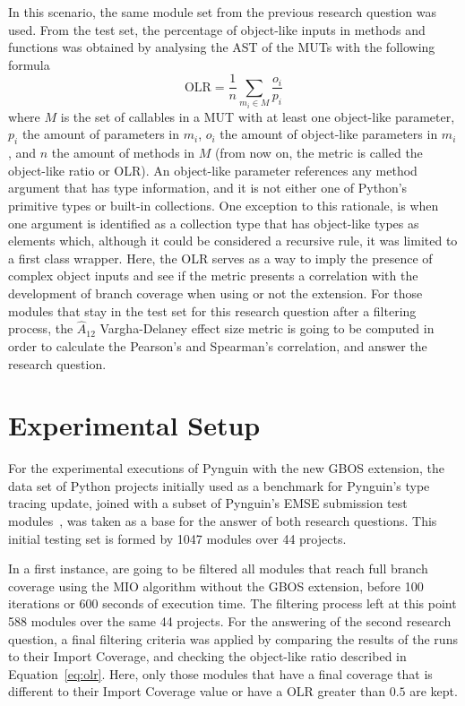 \documentclass[%
  chapterprefix=false,%
  open=right,%
  twoside=true,%
  paper=a4,%
  logofile={Figures/logo.png},%
  thesistype=master,%
  UKenglish,%
]{se2thesis}
\begin{document}
In this scenario, the same module set from the previous research question was used.
From the test set, the percentage of object-like inputs in methods and functions was obtained by analysing the AST of the MUTs with the following formula
\begin{equation}\label{eq:olr}
\text{OLR} = \frac{1}{n}\sum_{m_i \in M} \frac{o_i}{p_i}
\end{equation}
where \(M\) is the set of callables in a MUT with at least one object-like parameter, \(p_i\) the amount of parameters in \(m_i\), \(o_i\) the amount of object-like parameters in \(m_i\), and \(n\) the amount of methods in \(M\) (from now on, the metric is called the object-like ratio or OLR).
An object-like parameter references any method argument that has type information, and it is not either one of Python's primitive types or built-in collections.
One exception to this rationale, is when one argument is identified as a collection type that has object-like types as elements which, although it could be considered a recursive rule, it was limited to a first class wrapper.
Here, the OLR serves as a way to imply the presence of complex object inputs and see if the metric presents a correlation with the development of branch coverage when using or not the extension.
For those modules that stay in the test set for this research question after a filtering process, the \(\hat{A}_{12}\) Vargha-Delaney effect size metric is going to be computed in order to calculate the Pearson's and Spearman's correlation, and answer the research question. 

\section{Experimental Setup}\label{sec:experimental_setup}

For the experimental executions of Pynguin with the new GBOS extension, the data set of Python projects initially used as a benchmark for Pynguin's type tracing update, joined with a subset of Pynguin's EMSE submission test modules~\cite{DBLP:journals/corr/abs-2111-05003}, was taken as a base for the answer of both research questions.
This initial testing set is formed by 1047 modules over 44 projects.

In a first instance, are going to be filtered all modules that reach full branch coverage using the MIO algorithm without the GBOS extension, before 100 iterations or 600 seconds of execution time.
The filtering process left at this point 588 modules over the same 44 projects.
For the answering of the second research question, a final filtering criteria was applied by comparing the  results of the runs to their Import Coverage, and checking the object-like ratio described in Equation~\ref{eq:olr}.
Here, only those modules that have a final coverage that is different to their Import Coverage value or have a OLR greater than \(0.5\) are kept.
\end{document}

